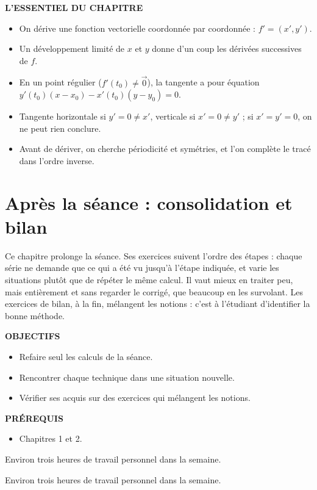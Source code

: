 \documentclass[a4paper,11pt]{article}
\numberwithin{equation}{section}
\numberwithin{figure}{section}
\numberwithin{table}{section}
\theoremstyle{enonce}
\theoremstyle{exemple}
\theoremstyle{remarque}
\newcommand{\ouverture}[3]{%
  \begin{tcolorbox}[enhanced,colback=Fond,colframe=Fond,arc=0pt,boxrule=0pt,left=12pt,right=12pt,top=10pt,bottom=10pt,
     before skip=1.2em,after skip=1.6em]
  \begin{minipage}[t]{0.56\linewidth}
  {\sffamily\bfseries\small\color{Bleu}OBJECTIFS}\par\vspace{0.3em}\small #1
  \end{minipage}\hfill
  \begin{minipage}[t]{0.38\linewidth}
  {\sffamily\bfseries\small\color{Bleu}PRÉREQUIS}\par\vspace{0.3em}\small #2
  \ifx\relax#3\relax\else\par\vspace{0.6em}{\sffamily\bfseries\small\color{Bleu}DURÉE}\par\vspace{0.2em}\small #3\fi
  \end{minipage}
  \end{tcolorbox}}
\newenvironment{essentiel}{\par\needspace{12\baselineskip}\vspace{1.5em}%
  \begin{tcolorbox}[enhanced,unbreakable,colback=white,colframe=white,boxrule=0pt,arc=0pt,
   borderline north={1.4pt}{0pt}{Ocre},left=2pt,right=2pt,top=8pt,bottom=4pt]
  {\sffamily\bfseries\color{Ocre}L'ESSENTIEL DU CHAPITRE}\par\medskip}{\end{tcolorbox}}
\newcommand{\ve}[1]{\vec{#1}}
\begin{document}
\begin{essentiel}\label{ess:2}
\begin{itemize}
\item On dérive une fonction vectorielle coordonnée par coordonnée : $f'=(x',y')$.
\item Un développement limité de $x$ et $y$ donne d'un coup les dérivées successives de $f$.
\item En un point régulier ($f'(t_0)\neq\ve0$), la tangente a pour équation $y'(t_0)(x-x_0)-x'(t_0)(y-y_0)=0$.
\item Tangente horizontale si $y'=0\neq x'$, verticale si $x'=0\neq y'$ ; si $x'=y'=0$, on ne peut rien conclure.
\item Avant de dériver, on cherche périodicité et symétries, et l'on complète le tracé dans l'ordre inverse.
\end{itemize}
\end{essentiel}

\clearpage
\section{Après la séance : consolidation et bilan}\label{sec:perso}

Ce chapitre prolonge la séance. Ses exercices suivent l'ordre des étapes : chaque série ne demande que ce qui a été vu
jusqu'à l'étape indiquée, et varie les situations plutôt que de répéter le même calcul. Il vaut mieux en traiter peu,
mais entièrement et sans regarder le corrigé, que beaucoup en les survolant. Les exercices de bilan, à la fin,
mélangent les notions : c'est à l'étudiant d'identifier la bonne méthode.

\ouverture{%
\begin{itemize}
\item Refaire seul les calculs de la séance.
\item Rencontrer chaque technique dans une situation nouvelle.
\item Vérifier ses acquis sur des exercices qui mélangent les notions.
\end{itemize}}{%
\begin{itemize}
\item Chapitres 1 et 2.
\end{itemize}}{Environ trois heures de travail personnel dans la semaine.}
\end{document}
